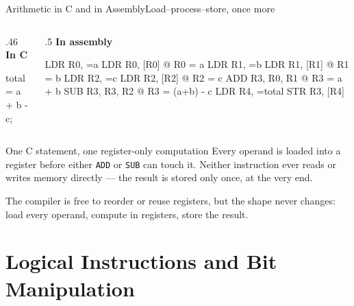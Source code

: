 \documentclass[9pt,aspectratio=169,xcolor=table]{beamer}
\begin{document}
\begin{frame}[fragile]{Arithmetic in C and in Assembly}{Load--process--store, once more}
    \begin{columns}[T]
    \begin{column}{.46\textwidth}
        \textbf{In C}

        \vspace{1mm}
        \begin{cc}
total = a + b - c;
\end{cc}
    \end{column}
    \begin{column}{.5\textwidth}
        \textbf{In assembly}

        \vspace{1mm}
        \begin{asm}
LDR   R0, =a
LDR   R0, [R0]    @ R0 = a
LDR   R1, =b
LDR   R1, [R1]    @ R1 = b
LDR   R2, =c
LDR   R2, [R2]    @ R2 = c
ADD   R3, R0, R1  @ R3 = a + b
SUB   R3, R3, R2  @ R3 = (a+b) - c
LDR   R4, =total
STR   R3, [R4]
\end{asm}
    \end{column}
    \end{columns}

    \vspace{1.5mm}
    \begin{block}{One C statement, one register-only computation}
        Every operand is \alert{loaded} into a register before either
        \texttt{ADD} or \texttt{SUB} can touch it. Neither instruction
        ever reads or writes memory directly --- the result is
        \alert{stored} only once, at the very end.
    \end{block}

    \vspace{1mm}
    {\small The compiler is free to reorder or reuse registers, but the
    shape never changes: \alert{load every operand, compute in
    registers, store the result.}}
\end{frame}


\section{Logical Instructions and Bit Manipulation}
\end{document}
